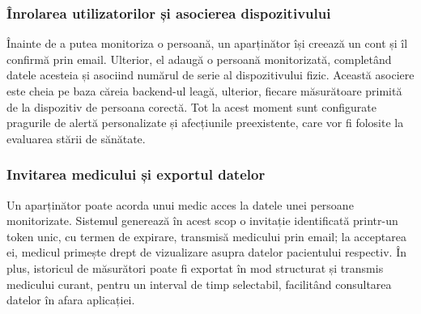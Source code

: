 ﻿\documentclass[12pt,a4paper,twoside]{article}
\begin{document}
\subsubsection{Înrolarea utilizatorilor și asocierea dispozitivului}

Înainte de a putea monitoriza o persoană, un aparținător își creează un cont și îl confirmă prin email. Ulterior, el adaugă o persoană monitorizată, completând datele acesteia și asociind numărul de serie al dispozitivului fizic. Această asociere este cheia pe baza căreia backend-ul leagă, ulterior, fiecare măsurătoare primită de la dispozitiv de persoana corectă. Tot la acest moment sunt configurate pragurile de alertă personalizate și afecțiunile preexistente, care vor fi folosite la evaluarea stării de sănătate.

\subsubsection{Invitarea medicului și exportul datelor}

Un aparținător poate acorda unui medic acces la datele unei persoane monitorizate. Sistemul generează în acest scop o invitație identificată printr-un token unic, cu termen de expirare, transmisă medicului prin email; la acceptarea ei, medicul primește drept de vizualizare asupra datelor pacientului respectiv. În plus, istoricul de măsurători poate fi exportat în mod structurat și transmis medicului curant, pentru un interval de timp selectabil, facilitând consultarea datelor în afara aplicației.
\end{document}

